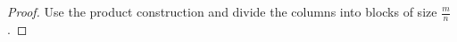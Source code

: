 \documentclass[a4paper,10pt]{article}
\newcommand{\JN}[1]{\marginpar{\parbox{4cm}{{\small {\bf JN:} #1}}}} %
\begin{document}
\begin{proof}
 Use the product construction and divide the columns into blocks of size $\frac{m}{n}$.
\end{proof}



\end{document}
